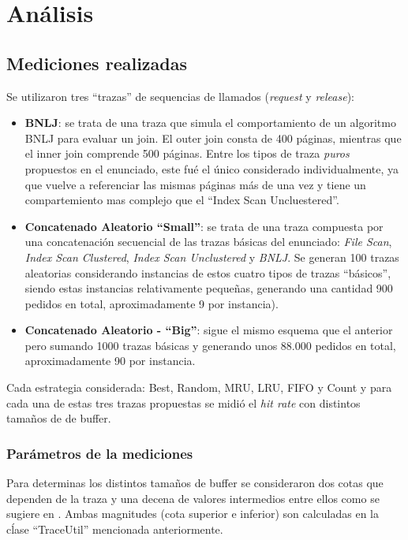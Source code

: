 \section{An\'alisis}

\subsection{Mediciones realizadas}
Se utilizaron tres ``trazas'' de sequencias de llamados (\textit{request} y \textit{release}):   
\begin{itemize}
\item \textbf{BNLJ}: se trata de una traza que simula el comportamiento de un algoritmo BNLJ para evaluar un join. 
El outer join consta de 400 p\'aginas, mientras que el inner join comprende 500 p\'aginas. 
Entre los tipos de traza \textit{puros} propuestos en el enunciado, este fu\'e el \'unico considerado individualmente, 
ya que vuelve a referenciar las mismas p\'aginas m\'as de una vez y tiene un compartemiento mas complejo que 
el ``Index Scan Uncluestered''. 
\item \textbf{Concatenado Aleatorio ``Small''}: se trata de una traza compuesta por una concatenaci\'on secuencial de 
las trazas b\'asicas del enunciado: \textit{File Scan}, \textit{Index Scan Clustered}, \textit{Index Scan Unclustered} 
y \textit{BNLJ}. Se generan 100 trazas aleatorias considerando instancias de estos cuatro tipos de trazas ``b\'asicos'',
siendo estas instancias relativamente pequeñas, generando una cantidad 900 pedidos en total, aproximadamente 9 por instancia). 
\item \textbf{Concatenado Aleatorio - ``Big''}: sigue el mismo esquema que el anterior pero sumando 1000 trazas b\'asicas y
generando unos 88.000 pedidos en total, aproximadamente 90 por instancia.
\end{itemize}

Cada estrategia considerada: Best, Random, MRU, LRU, FIFO y Count y para cada una de estas tres trazas propuestas se
midi\'o el \textit{hit rate} con distintos tama\~nos de de buffer. 

\subsubsection{Par\'ametros de la mediciones}
Para determinas los distintos tama\~nos de buffer se consideraron dos cotas que dependen de la traza y una decena de valores
intermedios entre ellos como se sugiere en \cite{eff84}. Ambas magnitudes (cota superior e inferior) son calculadas en la cĺase ``TraceUtil''
mencionada anteriormente.

